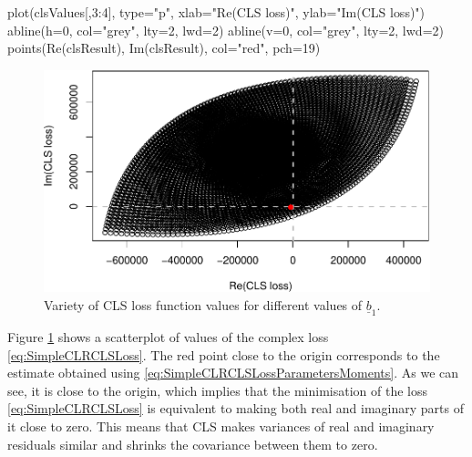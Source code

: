\documentclass[
]{book}
\newenvironment{Shaded}{\begin{snugshade}}{\end{snugshade}}
\newcommand{\AttributeTok}[1]{\textcolor[rgb]{0.77,0.63,0.00}{#1}}
\newcommand{\DecValTok}[1]{\textcolor[rgb]{0.00,0.00,0.81}{#1}}
\newcommand{\FunctionTok}[1]{\textcolor[rgb]{0.00,0.00,0.00}{#1}}
\newcommand{\NormalTok}[1]{#1}
\newcommand{\SpecialCharTok}[1]{\textcolor[rgb]{0.00,0.00,0.00}{#1}}
\newcommand{\StringTok}[1]{\textcolor[rgb]{0.31,0.60,0.02}{#1}}
\begin{document}
\begin{Shaded}
\begin{Highlighting}[]
\FunctionTok{plot}\NormalTok{(clsValues[,}\DecValTok{3}\SpecialCharTok{:}\DecValTok{4}\NormalTok{], }\AttributeTok{type=}\StringTok{"p"}\NormalTok{,}
     \AttributeTok{xlab=}\StringTok{"Re(CLS loss)"}\NormalTok{, }\AttributeTok{ylab=}\StringTok{"Im(CLS loss)"}\NormalTok{)}
\FunctionTok{abline}\NormalTok{(}\AttributeTok{h=}\DecValTok{0}\NormalTok{, }\AttributeTok{col=}\StringTok{"grey"}\NormalTok{, }\AttributeTok{lty=}\DecValTok{2}\NormalTok{, }\AttributeTok{lwd=}\DecValTok{2}\NormalTok{)}
\FunctionTok{abline}\NormalTok{(}\AttributeTok{v=}\DecValTok{0}\NormalTok{, }\AttributeTok{col=}\StringTok{"grey"}\NormalTok{, }\AttributeTok{lty=}\DecValTok{2}\NormalTok{, }\AttributeTok{lwd=}\DecValTok{2}\NormalTok{)}
\FunctionTok{points}\NormalTok{(}\FunctionTok{Re}\NormalTok{(clsResult), }\FunctionTok{Im}\NormalTok{(clsResult), }\AttributeTok{col=}\StringTok{"red"}\NormalTok{, }\AttributeTok{pch=}\DecValTok{19}\NormalTok{)}
\end{Highlighting}
\end{Shaded}

\begin{figure}
\centering
\includegraphics{Svetunkov---Svetunkov---Complex-Valued-Econometrics_files/figure-latex/clsScatter-1.pdf}
\caption{\label{fig:clsScatter}Variety of CLS loss function values for different values of \(\underline{b}_1\).}
\end{figure}

Figure \ref{fig:clsScatter} shows a scatterplot of values of the complex loss \eqref{eq:SimpleCLRCLSLoss}. The red point close to the origin corresponds to the estimate obtained using \eqref{eq:SimpleCLRCLSLossParametersMoments}. As we can see, it is close to the origin, which implies that the minimisation of the loss \eqref{eq:SimpleCLRCLSLoss} is equivalent to making both real and imaginary parts of it close to zero. This means that CLS makes variances of real and imaginary residuals similar and shrinks the covariance between them to zero.
\end{document}
